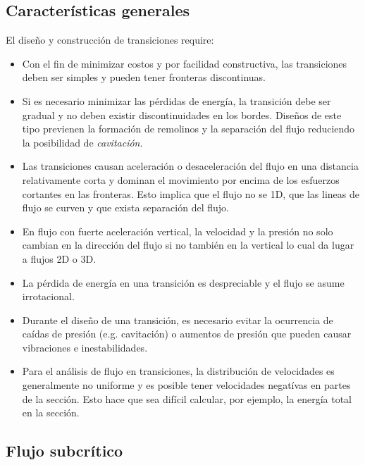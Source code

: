 \documentclass[11pt, oneside]{article}
\begin{document}
\subsection{Caracter\'isticas generales}
El diseño y construcci\'on de transiciones require:
\begin{itemize}
\item Con el fin de minimizar costos y por facilidad constructiva, las transiciones deben ser simples y pueden tener fronteras discontinuas.
\item Si es necesario minimizar las p\'erdidas de energ\'ia, la transici\'on debe ser gradual y no deben existir discontinuidades en los bordes. Diseños de este tipo previenen la formaci\'on de remolinos y la separaci\'on del flujo reduciendo la posibilidad de \emph{cavitaci\'on}.
\item Las transiciones causan aceleraci\'on o desaceleraci\'on del flujo en una distancia relativamente corta y dominan el movimiento por encima de los esfuerzos cortantes en las fronteras. Esto implica que el flujo no se 1D, que las lineas de flujo se curven y que exista separaci\'on del flujo. 
\item En flujo con fuerte aceleraci\'on vertical, la velocidad y la presi\'on no solo cambian en la direcci\'on del flujo si no  tambi\'en en la vertical lo cual da lugar a flujos 2D o 3D.
\item La p\'erdida de energ\'ia en una transici\'on es despreciable y el flujo se asume irrotacional. 
\item Durante el diseño de una transici\'on, es necesario evitar la ocurrencia de ca\'idas de presi\'on (e.g. cavitaci\'on) o aumentos de presi\'on que pueden causar vibraciones e inestabilidades. 
\item Para el an\'alisis de flujo en transiciones, la distribuci\'on de velocidades es generalmente no uniforme y es posible tener velocidades negat\'ivas en partes de la secci\'on. Esto hace que sea dif\'icil calcular, por ejemplo, la energ\'ia total en la secci\'on.
\end{itemize}

\subsection{Flujo subcr\'itico}
\end{document}
